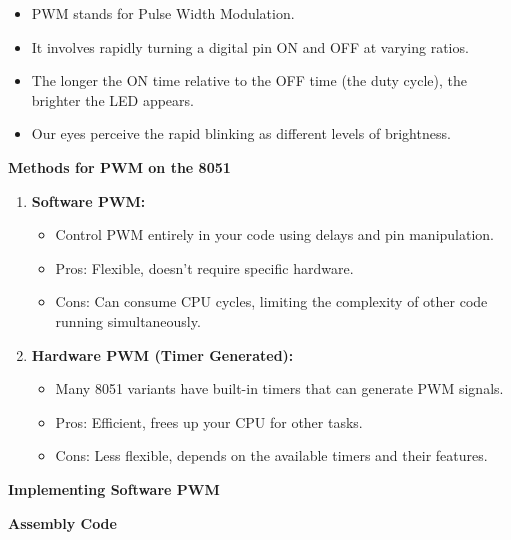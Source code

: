 \documentclass[
]{article}
\begin{document}
\begin{itemize}
\item
  PWM stands for Pulse Width Modulation.
\item
  It involves rapidly turning a digital pin ON and OFF at varying
  ratios.
\item
  The longer the ON time relative to the OFF time (the duty cycle), the
  brighter the LED appears.
\item
  Our eyes perceive the rapid blinking as different levels of
  brightness.
\end{itemize}

\textbf{Methods for PWM on the 8051}

\begin{enumerate}
\def\labelenumi{\arabic{enumi}.}
\item
  \textbf{Software PWM:}

  \begin{itemize}
  \item
    Control PWM entirely in your code using delays and pin manipulation.
  \item
    Pros: Flexible, doesn't require specific hardware.
  \item
    Cons: Can consume CPU cycles, limiting the complexity of other code
    running simultaneously.
  \end{itemize}
\item
  \textbf{Hardware PWM (Timer Generated):}

  \begin{itemize}
  \item
    Many 8051 variants have built-in timers that can generate PWM
    signals.
  \item
    Pros: Efficient, frees up your CPU for other tasks.
  \item
    Cons: Less flexible, depends on the available timers and their
    features.
  \end{itemize}
\end{enumerate}

\textbf{Implementing Software PWM}

\textbf{Assembly Code}
\end{document}
